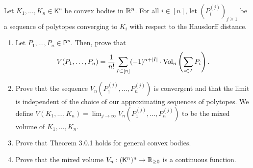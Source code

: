 \documentclass[12pt]{article}
\begin{document}
\begin{problem}
	Let $K_1, \ldots, K_n \in \mathsf{K}^n$ be convex bodies in $\mathbb{R}^n$. For all $i \in [n]$, let $(P_i^{(j)})_{j \geq 1}$ be a sequence of polytopes converging to $K_i$ with respect to the Hausdorff distance. 
    \begin{enumerate}[label = (\alph*)]
        \item Let $P_1, \ldots, P_n \in \mathsf{P}^n$. Then, prove that 
        \[
            V(P_1, \ldots, P_n) = \frac{1}{n!} \sum_{I \subset [n]} (-1)^{n + |I|} \cdot \operatorname{Vol}_n \left ( \sum_{i \in I} P_i \right ).
        \]  
        \item Prove that the sequence $V_n(P_1^{(j)}, \ldots, P_n^{(j)})$ is convergent and that the limit is independent of the choice of our approximating sequences of polytopes. We define $V(K_1, \ldots, K_n) = \lim_{j \to \infty} V_n(P_1^{(j)}, \ldots, P_n^{(j)})$ to be the mixed volume of $K_1, \ldots, K_n$. 
        
        \item Prove that Theorem 3.0.1 holds for general convex bodies. 
        
        \item Prove that the mixed volume $V_n : (\mathsf{K}^n)^n \to \mathbb{R}_{\geq 0}$ is a continuous function. 
    \end{enumerate}
\end{problem}
\end{document}
